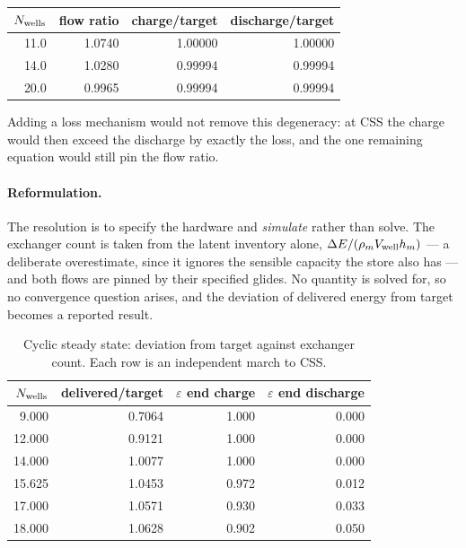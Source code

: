 \begin{center}
\begin{tabular}{@{}r r r r@{}}
\toprule
$N_{\mathrm{wells}}$ & flow ratio & charge/target & discharge/target \\
\midrule
11.0 & 1.0740 & 1.00000 & 1.00000 \\
14.0 & 1.0280 & 0.99994 & 0.99994 \\
20.0 & 0.9965 & 0.99994 & 0.99994 \\
\bottomrule
\end{tabular}
\end{center}

\noindent
Adding a loss mechanism would not remove this degeneracy: at CSS the charge
would then exceed the discharge by exactly the loss, and the one remaining
equation would still pin the flow ratio.

\paragraph{Reformulation.}
The resolution is to specify the hardware and \emph{simulate} rather than solve.
The exchanger count is taken from the latent inventory alone,
$\Delta E/(\rho_{m} V_{\mathrm{well}}h_{m})$ --- a deliberate overestimate, since it
ignores the sensible capacity the store also has --- and both flows are pinned
by their specified glides. No quantity is solved for, so no convergence question
arises, and the deviation of delivered energy from target becomes a reported
result.

\begin{table}[htbp]
\centering
\caption{Cyclic steady state: deviation from target against exchanger count.
Each row is an independent march to CSS.}
\label{tab:css}
\begin{tabular}{@{}r r r r@{}}
\toprule
$N_{\mathrm{wells}}$ & delivered/target & $\varepsilon$ end charge & $\varepsilon$ end discharge \\
\midrule
 9.000 & 0.7064 & 1.000 & 0.000 \\
12.000 & 0.9121 & 1.000 & 0.000 \\
14.000 & 1.0077 & 1.000 & 0.000 \\
15.625 & 1.0453 & 0.972 & 0.012 \\
17.000 & 1.0571 & 0.930 & 0.033 \\
18.000 & 1.0628 & 0.902 & 0.050 \\
\bottomrule
\end{tabular}
\end{table}

